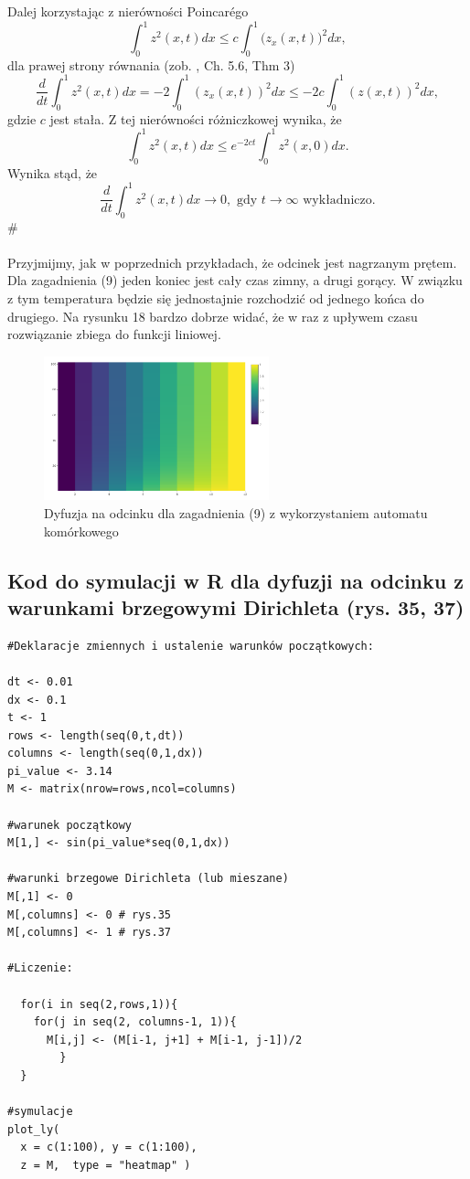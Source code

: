 \documentclass[a4paper,12pt]{article}
\begin{document}
Dalej korzystając z nierówności Poincar\'ego 
$$\int^1_0z^2(x,t)dx\leq c\int_0^1\Big(z_x(x,t)\Big)^2dx,$$
dla prawej strony równania (zob. \cite{ev}, Ch. 5.6, Thm 3)  
$$\frac{d}{dt}\int_0^1z^2(x,t)dx=-2\int_0^1(z_x(x,t))^2dx\leq-2c\int_0^1(z(x,t))^2dx,$$
gdzie $c$ jest stała. Z tej nierówności różniczkowej wynika, że
$$\int_0^1z^2(x,t)dx\leq e^{-2ct}\int_0^1z^2(x,0)dx.$$
Wynika stąd, że $$\frac{d}{dt}\int_0^1z^2(x,t)dx\rightarrow0, \textrm{ gdy } t\rightarrow\infty\textrm{ wykładniczo.}$$
\#\\\\
Przyjmijmy, jak w poprzednich przykładach, że odcinek jest nagrzanym prętem. Dla zagadnienia (9) jeden koniec jest cały czas zimny, a drugi gorący. W związku z tym temperatura będzie się jednostajnie rozchodzić od jednego końca do drugiego. Na rysunku 18 bardzo dobrze widać, że w raz z upływem czasu rozwiązanie zbiega do funkcji liniowej.
\begin{figure}[!htb]
    \centering
    \includegraphics[width=6.5cm]{dyfuzja.png}
    \caption{Dyfuzja na odcinku dla zagadnienia (9) z wykorzystaniem automatu komórkowego}
    \label{fig:my_label}
\end{figure}
\newpage
\subsection{Kod do symulacji w R dla dyfuzji na odcinku z warunkami brzegowymi Dirichleta (rys. 35, 37) }
\begin{verbatim}
#Deklaracje zmiennych i ustalenie warunków początkowych:
 
dt <- 0.01
dx <- 0.1  
t <- 1
rows <- length(seq(0,t,dt))
columns <- length(seq(0,1,dx))
pi_value <- 3.14
M <- matrix(nrow=rows,ncol=columns)

#warunek początkowy
M[1,] <- sin(pi_value*seq(0,1,dx))

#warunki brzegowe Dirichleta (lub mieszane)
M[,1] <- 0
M[,columns] <- 0 # rys.35
M[,columns] <- 1 # rys.37

#Liczenie:

  for(i in seq(2,rows,1)){
    for(j in seq(2, columns-1, 1)){
      M[i,j] <- (M[i-1, j+1] + M[i-1, j-1])/2
        }
  }
  
#symulacje
plot_ly(
  x = c(1:100), y = c(1:100),
  z = M,  type = "heatmap" )
\end{verbatim}
\end{document}
